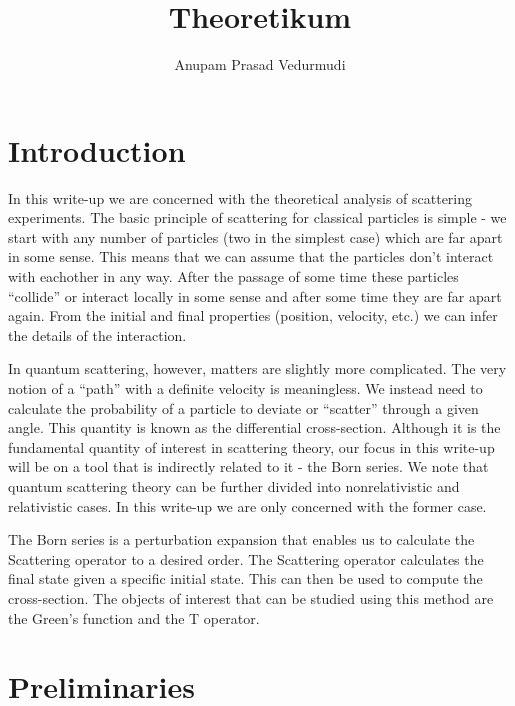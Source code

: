 \documentclass[a4paper,10pt]{report}
\title{Theoretikum}
\author{Anupam Prasad Vedurmudi}
\begin{document}
\maketitle

\begin{abstract}
 
\end{abstract}

\tableofcontents
\newpage
\section{Introduction}
In this write-up we are concerned with the theoretical analysis of scattering experiments.
The basic principle of scattering for classical particles is simple - we start with any number of particles 
(two in the simplest case) which are far apart in some sense. This means that we can assume that the particles 
don't interact with eachother in any way. After the passage of some time these particles ``collide'' or 
interact locally in some sense and after some time they are far apart again. From the initial and final 
properties (position, velocity, etc.) we can infer the details of the interaction.

In quantum scattering, however, matters are slightly more complicated. The very notion of a ``path'' with a definite velocity 
is meaningless. We instead need to calculate the probability of a particle to deviate or ``scatter'' through a given angle. This
quantity is known as the differential cross-section. Although it is the fundamental quantity of interest in scattering theory,
our focus in this write-up will be on a tool that is indirectly related to it - the Born series. We note that quantum scattering
theory can be further divided into nonrelativistic and relativistic cases. In this write-up we are only concerned with the former case.

The Born series is a perturbation expansion that enables us to calculate the Scattering operator to a desired order. 
The Scattering operator calculates the final state given a specific initial state. This can then be used to compute the
cross-section. The objects of interest that can be studied using this method are the Green's function and the T operator.
\section{Preliminaries}
\end{document}
